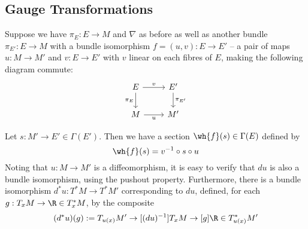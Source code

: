 
\subsection{Gauge Transformations}

Suppose we have $\pi_E : E \to M$ and $\nabla$ as before as well as another
bundle $\pi_{E'} : E \to M$ with a bundle isomorphism $f = (u, v) : E \to E'$ --
a pair of maps $u : M \to M'$ and $v : E \to E'$ with $v$ linear on each fibres
of $E$, making the following diagram commute:
\[\begin{tikzcd}
E \ar[d, "\pi_E" left] \ar[r, "v" above] & E' \ar[d, "\pi_{E'}" right]\\
M \ar[r, "u" below] & M'
\end{tikzcd}\]

Let $s : M' \to E' \in \Gamma(E')$. Then we have a section
$\wh{f}(s) \in \Gamma(E)$ defined by
\[
  \wh{f}(s) = v^{-1} \circ s \circ u
\]
Noting that $u : M \to M'$ is a diffeomorphism, it is easy to verify that $du$
is also a bundle isomorphism, using the pushout property. Furthermore, there is
a bundle isomorphism $d^*u : T^*M \to T^*M'$ corresponding to $du$, defined, for
each $g : T_xM \to \R \in T^*_xM$, by the composite
\[
  (d^*u)(g) := T_{u(x)}M' \to[(du)^{-1}] T_xM \to[g] \R \in T^*_{u(x)}M'
\]

